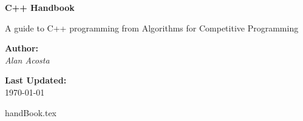 \documentclass[11pt, titlepage]{article}
\begin{document}
    \begin{titlepage}
        \begin{center}
            \vspace*{1cm}
            \Huge
            \textbf{C++ Handbook}
            
            \vspace{0.5cm}
            \LARGE
            A guide to C++ programming from Algorithms for Competitive Programming
            
            \vspace{1.5cm}
            \textbf{Author:} \\
            \Large
            \textit{Alan Acosta}
            
            \vfill
            \Large
            \textbf{Last Updated:} \\
            \today
        \end{center}
    \end{titlepage}

    \tableofcontents

    \newpage
    {handBook.tex}
\end{document}
